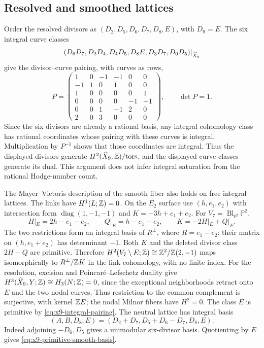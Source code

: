 \subsection{Resolved and smoothed lattices}
Order the resolved divisors as $(D_2,D_5,D_6,D_7,D_8,E)$, with
$D_9=E$. The six integral curve classes
\begin{equation}
 (D_6D_7,D_2D_4,D_4D_5,D_8E,D_3D_7,D_0D_5)|_{\widehat X_9}
\end{equation}
give the divisor--curve pairing, with curves as rows,
\begin{equation}
 P=\begin{pmatrix}
 1&0&-1&-1&0&0\\-1&1&0&1&0&0\\1&0&0&0&0&1\\
 0&0&0&0&-1&-1\\0&0&1&-1&2&0\\2&0&3&0&0&0
 \end{pmatrix},\qquad \det P=1.
 \label{eq:x9-integral-pairing}
\end{equation}
Since the six divisors are already a rational basis, any integral
cohomology class has rational coordinates whose pairing with these
curves is integral. Multiplication by $P^{-1}$ shows that those
coordinates are integral. Thus the displayed divisors generate
$H^2(\widehat X_9;\mathbb Z)/\mathrm{tors}$, and the displayed curve classes
generate its dual. This argument does not infer integral saturation
from the rational Hodge-number count.

The Mayer--Vietoris description of the smooth fiber also holds on free
integral lattices. The links have $H^1(L;\mathbb Z)=0$. On the $E_2$ surface
use $(h,e_1,e_2)$ with intersection form $\operatorname{diag}(1,-1,-1)$
and $K=-3h+e_1+e_2$. For $V_7=\operatorname{Bl}_{pt}\mathbb P^3$,
\begin{equation}
 H|_E=2h-e_1-e_2,\qquad Q|_E=h-e_1-e_2,\qquad
 K=-2H|_E+Q|_E.
 \label{eq:x9-integral-local-gluing}
\end{equation}
The two restrictions form an integral basis of $R^\perp$, where
$R=e_1-e_2$: their matrix on $(h,e_1+e_2)$ has determinant $-1$.
Both $K$ and the deleted divisor class $2H-Q$ are primitive. Therefore
$H^2(V_7\setminus E;\mathbb Z)\cong\mathbb Z^2/\mathbb Z(2,-1)$ maps isomorphically
to $R^\perp/\mathbb Z K$ in the link cohomology, with no finite index.
For the resolution, excision and Poincar\'e--Lefschetz duality give
$H^3(\widehat X_9,Y;\mathbb Z)\cong H_3(N;\mathbb Z)=0$, since the exceptional
neighborhoods retract onto $E$ and the two nodal curves. Thus restriction
to the common complement is surjective, with kernel $\mathbb Z E$; the nodal
Milnor fibers have $H^2=0$. The class $E$ is primitive by
\eqref{eq:x9-integral-pairing}. The neutral
lattice has integral basis
\begin{equation}
 (A,B,D_8,E)=(D_2+D_7,D_5+D_6-D_7,D_8,E).
\end{equation}
Indeed adjoining $-D_6,D_5$ gives a unimodular six-divisor basis.
Quotienting by $E$ gives \eqref{eq:x9-primitive-smooth-basis}.

